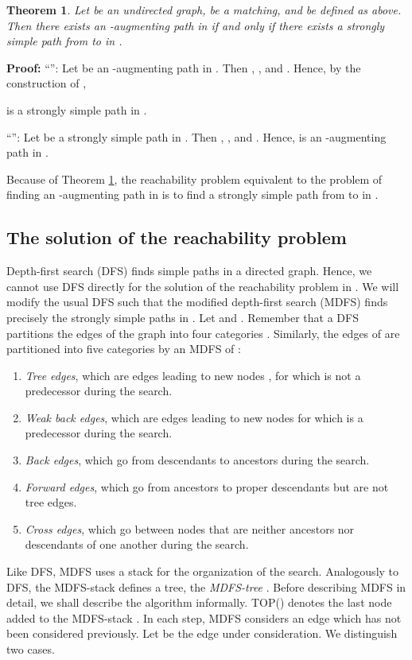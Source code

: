 \documentclass[12pt,twoside,a4paper]{article}
\def\QED{\hbox{\hskip 1pt \vrule width4pt height 6pt depth 1.5pt \hskip 1pt}}
\newtheorem{theo}{Theorem}
\begin{document}
\begin{theo} \label{theo1}
Let  be an undirected graph,  be a matching, and
 be defined as above. Then there exists an -augmenting path
in  if and only if there exists a
strongly simple path from  to  in .
\end{theo}
{\bf Proof:}
``'': Let  be an
-augmenting path in . Then , ,
and . Hence, by the construction of ,

is a strongly simple path in .

\medskip
\noindent 
``'':
Let  be a strongly simple path in . Then
, , and . Hence,
 is an -augmenting path in .
\QED

\medskip
Because of Theorem \ref{theo1}, the reachability problem equivalent to the problem
of finding an -augmenting path in  is to find a 
strongly simple path from  to  in .

\subsection{The solution of the reachability problem}

Depth-first search (DFS) finds simple paths in a directed graph. Hence, we 
cannot
use DFS directly for the solution of the reachability problem in . We will
modify the usual DFS such that the modified depth-first search (MDFS) finds
precisely the strongly simple paths in .
Let  and . Remember that
a DFS partitions the edges of the graph into four categories \cite{AHU}.
Similarly, the edges of  are partitioned into five categories by an
MDFS of :
\begin{enumerate}
\item {\em Tree edges\/}, which are edges leading to new nodes ,
 for which
 is not a predecessor during the search.
\item {\em Weak back edges\/}, which are edges leading to new nodes  for
which  is a predecessor during the search.
\item {\em Back edges\/}, which go from descendants to ancestors during the 
search.
\item {\em Forward edges\/}, which go from ancestors to proper descendants but
are not tree edges.
\item {\em Cross edges\/}, which go between nodes that are neither ancestors
nor descendants of one another during the search.
\end{enumerate}
Like DFS, MDFS uses a stack  for the organization of the search. Analogously
to DFS, the MDFS-stack  defines a tree, the {\em MDFS-tree} . Before
describing MDFS in detail, we shall describe the algorithm informally. TOP()
denotes the last node added to the MDFS-stack . In each step, MDFS considers
an edge  which has not been considered previously.
Let  be the edge under consideration. We 
distinguish two cases.
\end{document}
